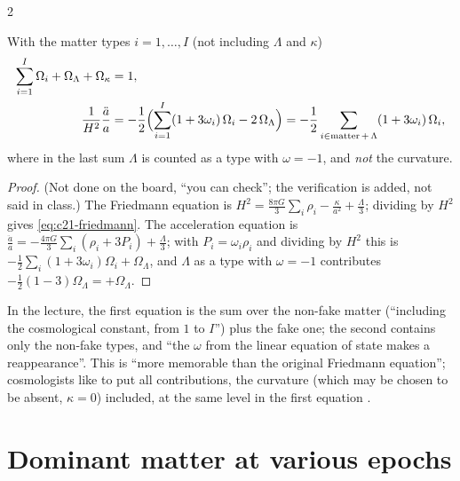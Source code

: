 \begin{paracol}{2}
\begin{theorem}\label{thm:c21-friedmann}
With the matter types $i=1,\dots,I$ (not including $\Lambda$ and $\kappa$)
\begin{align}
  \sum_{i=1}^{I}\Omega_i+\Omega_\Lambda+\Omega_\kappa&=1,\label{eq:c21-friedmann}\\
  \frac{1}{H^2}\frac{\ddot a}{a}&=-\frac12\Bigl(\sum_{i=1}^{I}(1+3\omega_i)\,\Omega_i-2\,\Omega_\Lambda\Bigr)=-\frac12\sum_{i\in\text{matter}\,+\,\Lambda}(1+3\omega_i)\,\Omega_i,\label{eq:c21-accel}
\end{align}
where in the last sum $\Lambda$ is counted as a type with $\omega=-1$, and \emph{not} the curvature.
\end{theorem}
\begin{proof}
(Not done on the board, ``you can check''; the verification is added, not said in class.) The Friedmann equation is $H^2=\frac{8\pi G}3\sum_i\rho_i-\frac{\kappa}{a^2}+\frac\Lambda3$; dividing by $H^2$ gives \eqref{eq:c21-friedmann}. The acceleration equation is $\frac{\ddot a}a=-\frac{4\pi G}{3}\sum_i(\rho_i+3P_i)+\frac\Lambda3$; with $P_i=\omega_i\rho_i$ and dividing by $H^2$ this is $-\frac12\sum_i(1+3\omega_i)\Omega_i+\Omega_\Lambda$, and $\Lambda$ as a type with $\omega=-1$ contributes $-\frac12(1-3)\Omega_\Lambda=+\Omega_\Lambda$.
\end{proof}
In the lecture, the first equation is the sum over the non-fake matter (``including the cosmological constant, from $1$ to $I$'') plus the fake one; the second contains only the non-fake types, and ``the $\omega$ from the linear equation of state makes a reappearance''. This is ``more memorable than the original Friedmann equation''; cosmologists like to put all contributions, the curvature (which may be chosen to be absent, $\kappa=0$) included, at the same level in the first equation .

\section{Dominant matter at various epochs}\label{sec:c21-dominant}


\end{paracol}
